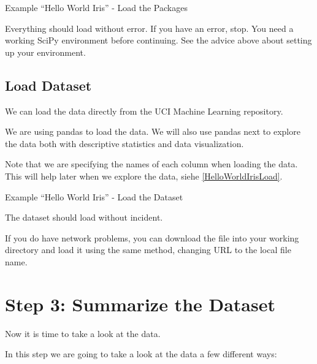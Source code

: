 \begin{code}
        
    
    \caption{Example ``Hello World Iris'' - Load the Packages}\label{HelloWorldIrisLoad}
\end{code}      

    
Everything should load without error. If you have an error, stop. You need a working SciPy environment before continuing. See the advice above about setting up your environment.
    
    
\subsection{Load Dataset}

We can load the data directly from the UCI Machine Learning repository.
    
We are using pandas to load the data. We will also use pandas next to explore the data both with descriptive statistics and data visualization.

Note that we are specifying the names of each column when loading the data. This will help later when we explore the data, siehe \ref{HelloWorldIrisLoad}.



\begin{code}
        
    
    \caption{Example ``Hello World Iris'' - Load the Dataset}\label{HelloWorldIrisLoad2}
\end{code}      
 
The dataset should load without incident.
    
If you do have network problems, you can download the \href{../Code/General/HelloWorldIris/Iris.txt}{} file into your working directory and load it using the same method, changing URL to the local file name.
 
     
\section{Step 3: Summarize the Dataset}

Now it is time to take a look at the data.
    
In this step we are going to take a look at the data a few different ways:

